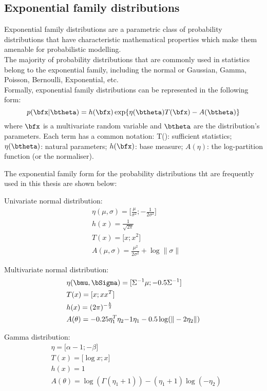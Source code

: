 \subsection{Exponential family distributions} \label{section:exponential_family}

Exponential family distributions are a parametric class of probability distributions that have characteristic mathematical properties which make them amenable for probabilistic modelling.\\
The majority of probability distributions that are commonly used in statistics belong to the exponential family, including the normal or Gaussian, Gamma, Poisson, Bernoulli, Exponential, etc.\\
Formally, exponential family distributions can be represented in the following form:
\begin{equation} \label{eq:exponential_family}
	p(\bfx|\btheta) = h(\bfx) \exp \{ \eta(\btheta) T(\bfx) - A(\btheta) \}
\end{equation}
where $\bfx$ is a multivariate random variable and $\btheta$ are the distribution's parameters. Each term has a common notation: T(\bfx): sufficient statistics; $\eta(\btheta)$: natural parameters; $h(\bfx)$: base measure; $A(\eta)$: the log-partition function (or the normaliser).

The exponential family form for the probability distributions tht are frequently used in this thesis are shown below:

Univariate normal distribution:
\begin{align*}
	& \eta(\mu,\sigma) = \lbrack \frac{\mu}{\sigma^2}; -\frac{1}{2\sigma^2} \rbrack \\
	& h(x) = \frac{1}{\sqrt{2\pi}} \\
	& T(x) = \lbrack x; x^2 \rbrack \\
	& A(\mu,\sigma) = \frac{\mu^2}{2\sigma^2} + \log \| \sigma \|
\end{align*}

Multivariate normal distribution:
\begin{align*}
	& \eta(\bmu,\bSigma)  = \lbrack\Sigma^{-1} \mu; -0.5\Sigma^{-1} \rbrack \\
	& T(x) = \lbrack x; xx^T \rbrack \\
	& h(x) = (2\pi)^{-\frac{k}{2}} \\
	& A(\theta) = -0.25\eta_1^T \eta_2{-1} \eta_1 - 0.5\log(\|-2\eta_2\|)
\end{align*}

Gamma distribution:
\begin{align*}
	& \eta = \lbrack \alpha - 1; -\beta \rbrack \\
	& T(x) = \lbrack \log x; x \rbrack \\
	& h(x) = 1 \\
	& A(\theta) = \log(\Gamma(\eta_1 + 1)) - (\eta_1 + 1) \log(-\eta_2)
\end{align*}

